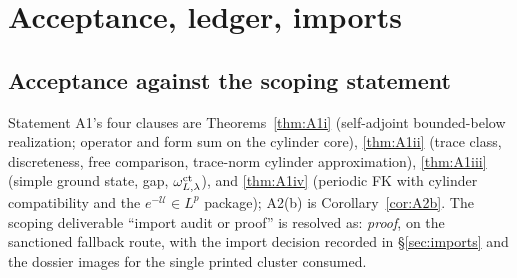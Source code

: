 \documentclass[11pt,a4paper]{article}
\theoremstyle{plain}
\theoremstyle{definition}
\newcommand{\U}{\mathcal U}
\begin{document}
\section{Acceptance, ledger, imports}\label{sec:ledger}

\subsection*{Acceptance against the scoping statement}

Statement A1's four clauses are Theorems~\ref{thm:A1i} (self-adjoint
bounded-below realization; operator and form sum on the cylinder core),
\ref{thm:A1ii} (trace class, discreteness, free comparison, trace-norm
cylinder approximation), \ref{thm:A1iii} (simple ground state, gap,
$\omega^{\rm ct}_{L,\lambda}$), and \ref{thm:A1iv} (periodic FK with
cylinder compatibility and the $e^{-\U}\in L^p$ package); A2(b) is
Corollary~\ref{cor:A2b}. The scoping deliverable ``import audit or
proof'' is resolved as: \emph{proof}, on the sanctioned fallback route,
with the import decision recorded in \S\ref{sec:imports} and the dossier
images for the single printed cluster consumed.
\end{document}
